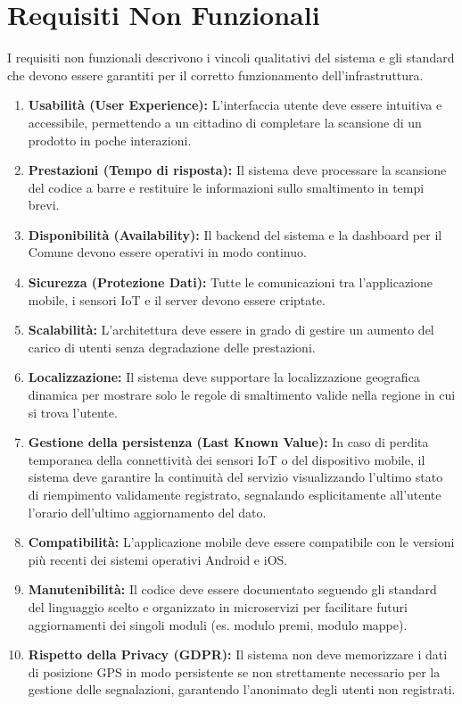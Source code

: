 \documentclass[12pt,a4paper]{article}
\begin{document}
\section{Requisiti Non Funzionali}

I requisiti non funzionali descrivono i vincoli qualitativi del sistema e gli standard che devono essere garantiti per il corretto funzionamento dell'infrastruttura.

\begin{enumerate}[label=\textbf{(RNF\arabic*)}]
    \item \textbf{Usabilità (User Experience):} L'interfaccia utente deve essere intuitiva e accessibile, permettendo a un cittadino di completare la scansione di un prodotto in poche interazioni.
    \item \textbf{Prestazioni (Tempo di risposta):} Il sistema deve processare la scansione del codice a barre e restituire le informazioni sullo smaltimento in tempi brevi.
    \item \textbf{Disponibilità (Availability):} Il backend del sistema e la dashboard per il Comune devono essere operativi in modo continuo.
    \item \textbf{Sicurezza (Protezione Dati):} Tutte le comunicazioni tra l'applicazione mobile, i sensori IoT e il server devono essere criptate.
    \item \textbf{Scalabilità:} L'architettura deve essere in grado di gestire un aumento del carico di utenti senza degradazione delle prestazioni.
    \item \textbf{Localizzazione:} Il sistema deve supportare la localizzazione geografica dinamica per mostrare solo le regole di smaltimento valide nella regione in cui si trova l'utente.
    \item \textbf{Gestione della persistenza (Last Known Value):} In caso di perdita temporanea della connettività dei sensori IoT o del dispositivo mobile, il sistema deve garantire la continuità del servizio visualizzando l'ultimo stato di riempimento validamente registrato, segnalando esplicitamente all'utente l'orario dell'ultimo aggiornamento del dato.
    \item \textbf{Compatibilità:} L'applicazione mobile deve essere compatibile con le versioni più recenti dei sistemi operativi Android e iOS.
    \item \textbf{Manutenibilità:} Il codice deve essere documentato seguendo gli standard del linguaggio scelto e organizzato in microservizi per facilitare futuri aggiornamenti dei singoli moduli (es. modulo premi, modulo mappe).
    \item \textbf{Rispetto della Privacy (GDPR):} Il sistema non deve memorizzare i dati di posizione GPS in modo persistente se non strettamente necessario per la gestione delle segnalazioni, garantendo l'anonimato degli utenti non registrati.
\end{enumerate}
\end{document}
